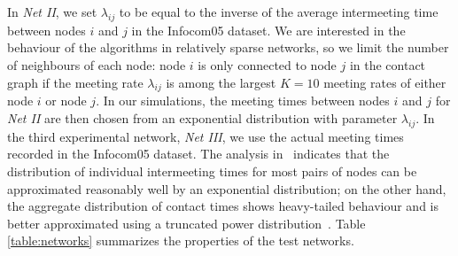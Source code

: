 \documentclass[journal,onecolumn,11pt]{IEEEtran}
\theoremstyle{plain}
\theoremstyle{definition}
\begin{document}
In {\em Net II}, we set $\lambda_{ij}$ to be equal to the inverse of
the average intermeeting time between nodes $i$ and $j$ in the
Infocom05 dataset. We are interested in the behaviour of the
algorithms in relatively sparse networks, so we limit the number of
neighbours of each node: node $i$ is only connected to node $j$ in the
contact graph if the meeting rate $\lambda_{ij}$ is among the largest
$K=10$ meeting rates of either node $i$ or node $j$. In our simulations, the meeting
times between nodes $i$ and $j$ for {\em Net II} are then chosen from an exponential
distribution with parameter $\lambda_{ij}$. In the third experimental
network, {\em Net III}, we use the actual meeting times recorded in
the Infocom05 dataset. The analysis in~\cite{gao2009} indicates that
the distribution of individual intermeeting times for most pairs of
nodes can be approximated reasonably well by an exponential
distribution; on the other hand, the aggregate distribution of contact
times shows heavy-tailed behaviour and is better approximated using a
truncated power distribution~\cite{chaintreau2007impact, cai2009}.
Table \ref{table:networks} summarizes the properties of the test networks.
\end{document}
